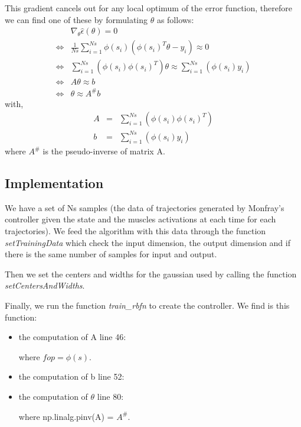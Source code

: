 \documentclass[pdftex,a4paper,12pt]{report}
\begin{document}
This gradient cancels out for any local optimum of the error function, therefore we can find one of these by formulating $\theta$ as follows:
\begin{eqnarray}
 & \nabla_\theta\hat{\epsilon}(\theta) = 0 \nonumber \\
\Leftrightarrow & \frac{1}{Ns}\sum\limits_{i=1}^{Ns}\phi(s_i)(\phi(s_i)^T\mathbb{\theta} - y_i) \approx 0 \nonumber \\
\Leftrightarrow & \sum\limits_{i=1}^{Ns}(\phi(s_i)\phi(s_i)^T)\mathbb{\theta} \approx \sum\limits_{i=1}^{Ns}(\phi(s_i)y_i) \nonumber \\
\Leftrightarrow & A\mathbb{\theta} \approx b \nonumber \\
\Leftrightarrow & \mathbb{\theta} \approx A^\#b \nonumber
\end{eqnarray}
with,
\begin{eqnarray}
A & = & \sum\limits_{i=1}^{Ns}(\phi(s_i)\phi(s_i)^T) \\
b & = & \sum\limits_{i=1}^{Ns}(\phi(s_i)y_i)
\end{eqnarray}
where $A^\#$ is the pseudo-inverse of matrix A.

\subsection{Implementation}
We have a set of Ns samples (the data of trajectories generated by Monfray's controller given the state and the muscles activations at each time for each trajectories). We feed the algorithm with this data through the function \textit{setTrainingData} which check the input dimension, the output dimension and if there is the same number of samples for input and output.

Then we set the centers and widths for the gaussian used by calling the function \textit{setCentersAndWidths}.

Finally, we run the function \textit{train\_rbfn} to create the controller. We find is this function:
\begin{itemize}
\item the computation of A line 46:

where $fop = \phi(s)$.
\item the computation of b line 52:

\item the computation of $\theta$ line 80:

where np.linalg.pinv(A) = $A^\#$.
\end{itemize}
 
\end{document}
